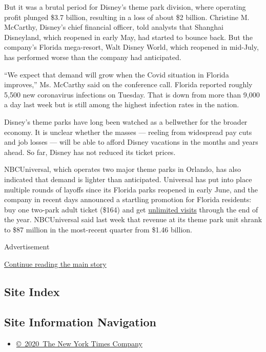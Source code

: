 But it was a brutal period for Disney's theme park division, where
operating profit plunged \$3.7 billion, resulting in a loss of about \$2
billion. Christine M. McCarthy, Disney's chief financial officer, told
analysts that Shanghai Disneyland, which reopened in early May, had
started to bounce back. But the company's Florida mega-resort, Walt
Disney World, which reopened in mid-July, has performed worse than the
company had anticipated.

``We expect that demand will grow when the Covid situation in Florida
improves,'' Ms. McCarthy said on the conference call. Florida reported
roughly 5,500 new coronavirus infections on Tuesday. That is down from
more than 9,000 a day last week but is still among the highest infection
rates in the nation.

Disney's theme parks have long been watched as a bellwether for the
broader economy. It is unclear whether the masses --- reeling from
widespread pay cuts and job losses --- will be able to afford Disney
vacations in the months and years ahead. So far, Disney has not reduced
its ticket prices.

NBCUniversal, which operates two major theme parks in Orlando, has also
indicated that demand is lighter than anticipated. Universal has put
into place multiple rounds of layoffs since its Florida parks reopened
in early June, and the company in recent days announced a startling
promotion for Florida residents: buy one two-park adult ticket (\$164)
and get
\href{https://insidethemagic.net/2020/08/free-access-universal-orlando-ro1/}{unlimited
visits} through the end of the year. NBCUniversal said last week that
revenue at its theme park unit shrank to \$87 million in the most-recent
quarter from \$1.46 billion.

Advertisement

\protect\hyperlink{after-bottom}{Continue reading the main story}

\hypertarget{site-index}{%
\subsection{Site Index}\label{site-index}}

\hypertarget{site-information-navigation}{%
\subsection{Site Information
Navigation}\label{site-information-navigation}}

\begin{itemize}
\tightlist
\item
  \href{https://help.nytimes.com/hc/en-us/articles/115014792127-Copyright-notice}{©~2020~The
  New York Times Company}
\end{itemize}

